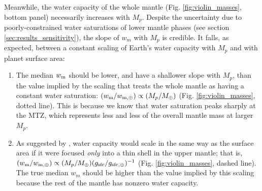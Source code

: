 \documentclass[fleqn,usenatbib]{mnras}
\newcommand{\todo}[1]{\textit{\textcolor{violet}{{#1}}}}
\begin{document}
Meanwhile, the water capacity of the whole mantle (Fig. \ref{fig:violin_masses}, bottom panel) necessarily increases with $M_p$. Despite the uncertainty due to poorly-constrained water saturations of lower mantle phases (see section \ref{sec:results_sensitivity}), the slope of $w_m$ with $M_p$ is credible. It falls, as expected, between a constant scaling of Earth's water capacity with $M_p$ and with planet surface area: 

\begin{enumerate}
\item The median $w_{\rm m}$ should be lower, and have a shallower slope with $M_p$, than the value implied by the scaling that treats the whole mantle as having a constant water saturation: $(w_{\rm m}/w_{\rm m, \oplus}) \propto (M_p / M_\oplus)$ (Fig. \ref{fig:violin_masses}, dotted line). This is because we know that water saturation peaks sharply at the MTZ, which represents less and less of the overall mantle mass at larger $M_p$.



\item As suggested by \citet{cowan_water_2014}, water capacity would scale in the same way as the surface area if it were focused \textit{only} into a thin shell in the upper mantle; that is, $(w_{\rm m} / w_{\rm m, \oplus}) \propto (M_p / M_\oplus) (g_{\rm sfc}/g_{\rm sfc, \oplus})^{-1}$ (Fig. \ref{fig:violin_masses}, dashed line). The true median $w_m$ should be higher than the value implied by this scaling because the rest of the mantle has nonzero water capacity. 

\end{enumerate}
\end{document}
